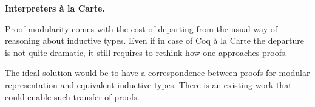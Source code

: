\documentclass[sigplan,nonacm]{acmart}
\begin{document}

\medskip
\textbf{Interpreters à la Carte.}


\medskip




Proof modularity comes with the cost of departing from the usual way of reasoning about inductive types. 
Even if in case of Coq à la Carte the departure is not quite dramatic, it still requires to rethink how one approaches proofs.

The ideal solution would be to have a correspondence between proofs for modular representation and equivalent inductive types. 
There is an existing work\cite{cohen2024trocq} that could enable such transfer of proofs. 







\appendix
\end{document}
